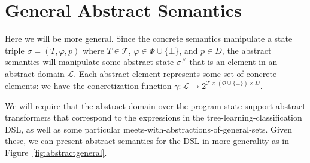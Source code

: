 \section{General Abstract Semantics}

Here we will be more general.
Since the concrete semantics manipulate a state triple $\sigma = (T, \varphi, p)$
where $T \in \mathcal{T}$, $\varphi \in \Phi \cup \{ \bot \}$, and $p \in D$,
the abstract semantics will manipulate some abstract state $\sigma^\#$
that is an element in an abstract domain $\mathcal{L}$.
Each abstract element represents some set of concrete elements:
we have the concretization function
$\gamma : \mathcal{L} \rightarrow 2^{\mathcal{T} \times (\Phi \cup \{\bot\}) \times D}$.

We will require that the abstract domain over the program state
support abstract transformers that correspond to the expressions
in the tree-learning-classification DSL,
as well as some particular meets-with-abstractions-of-general-sets.
Given these, we can present abstract semantics for the DSL in more generality
as in Figure~\ref{fig:abstractgeneral}.

